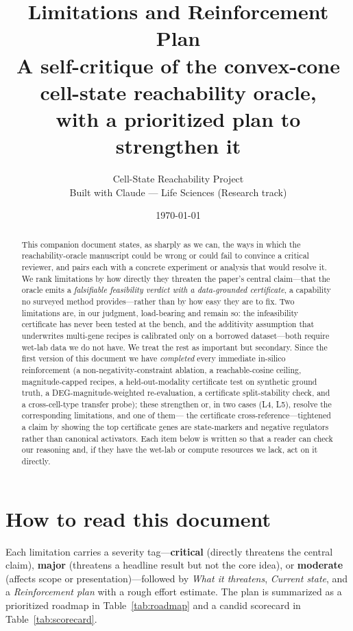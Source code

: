 \documentclass[11pt]{article}
\title{\bfseries Limitations and Reinforcement Plan\\
\large A self-critique of the convex-cone cell-state reachability oracle,\\
with a prioritized plan to strengthen it}
\author{Cell-State Reachability Project \\ \small Built with Claude --- Life Sciences (Research track)}
\date{\today}
\newcommand{\sev}[2]{\textcolor{#1}{\textbf{#2}}}
\begin{document}
\maketitle

\begin{abstract}
\noindent
This companion document states, as sharply as we can, the ways in which the reachability-oracle
manuscript could be wrong or could fail to convince a critical reviewer, and pairs each with a
concrete experiment or analysis that would resolve it. We rank limitations by how directly they
threaten the paper's central claim---that the oracle emits a \emph{falsifiable feasibility
verdict with a data-grounded certificate}, a capability no surveyed method provides---rather
than by how easy they are to fix. Two limitations are, in our judgment, load-bearing and remain
so: the infeasibility certificate has never been tested at the bench, and the additivity
assumption that underwrites multi-gene recipes is calibrated only on a borrowed dataset---both
require wet-lab data we do not have. We treat the rest as important but secondary. Since the
first version of this document we have \emph{completed} every immediate in-silico reinforcement
(a non-negativity-constraint ablation, a reachable-cosine ceiling, magnitude-capped recipes, a
held-out-modality certificate test on synthetic ground truth, a DEG-magnitude-weighted
re-evaluation, a certificate split-stability check, and a cross-cell-type transfer probe); these
strengthen or, in two cases (L4, L5), resolve the corresponding limitations, and one of them---%
the certificate cross-reference---tightened a claim by showing the top certificate genes are
state-markers and negative regulators rather than canonical activators. Each item below is
written so that a reader can check our reasoning and, if they have the wet-lab or compute
resources we lack, act on it directly.
\end{abstract}

\section*{How to read this document}
Each limitation carries a severity tag---\sev{sev1}{critical} (directly threatens the central
claim), \sev{sev2}{major} (threatens a headline result but not the core idea), or
\sev{sev3}{moderate} (affects scope or presentation)---followed by \emph{What it threatens},
\emph{Current state}, and a \emph{Reinforcement plan} with a rough effort estimate. The plan is
summarized as a prioritized roadmap in Table~\ref{tab:roadmap} and a candid scorecard in
Table~\ref{tab:scorecard}.
\end{document}

